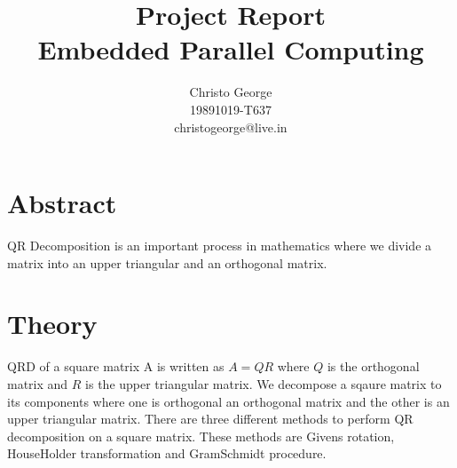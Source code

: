 \documentclass[11pt,titlepage]{article} %
\title{Project Report\\Embedded Parallel Computing}
\author{Christo George\\19891019-T637\\christogeorge@live.in}
\begin{document}
\maketitle
\newpage
    \tableofcontents
\newpage 
\section{Abstract} 
QR Decomposition is an important process in mathematics where we divide a matrix into an upper triangular and an orthogonal matrix.
\section{Theory} 
QRD of a square matrix A is written as $A = QR$ where $Q$ is the orthogonal matrix and $R$ is the upper triangular matrix. 
We decompose a sqaure matrix to its components where one is orthogonal an orthogonal matrix and the other is an upper triangular matrix. 
There are three different methods to perform QR decomposition on a square matrix. 
These methods are Givens rotation, HouseHolder transformation and GramSchmidt procedure. 


\end{document}
